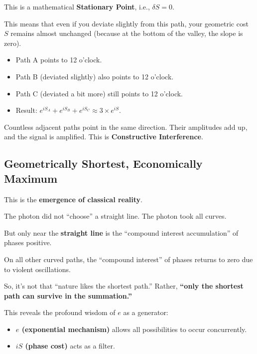 This is a mathematical \textbf{Stationary Point}, i.e., $\delta S = 0$.

This means that even if you deviate slightly from this path, your geometric cost $S$ remains almost unchanged (because at the bottom of the valley, the slope is zero).

\begin{itemize}
\item Path A points to 12 o'clock.

\item Path B (deviated slightly) also points to 12 o'clock.

\item Path C (deviated a bit more) still points to 12 o'clock.

\item Result: \textbf{$e^{iS_A} + e^{iS_B} + e^{iS_C} \approx 3 \times e^{iS}$}.
\end{itemize}

Countless adjacent paths point in the same direction. Their amplitudes add up, and the signal is amplified. This is \textbf{Constructive Interference}.

\subsection{Geometrically Shortest, Economically Maximum}

This is the \textbf{emergence of classical reality}.

The photon did not ``choose'' a straight line. The photon took all curves.

But only near the \textbf{straight line} is the ``compound interest accumulation'' of phases positive.

On all other curved paths, the ``compound interest'' of phases returns to zero due to violent oscillations.

So, it's not that ``nature likes the shortest path.'' Rather, \textbf{``only the shortest path can survive in the summation.''}

This reveals the profound wisdom of $e$ as a generator:

\begin{itemize}
\item \textbf{$e$ (exponential mechanism)} allows all possibilities to occur concurrently.

\item \textbf{$iS$ (phase cost)} acts as a filter.
\end{itemize}

